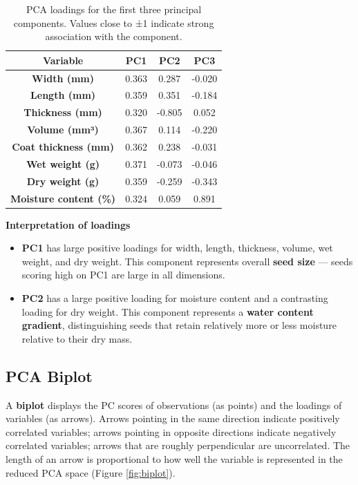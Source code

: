 \documentclass[
]{book}
\providecommand{\tightlist}{%
  \setlength{\itemsep}{0pt}\setlength{\parskip}{0pt}}
\begin{document}
\begin{table}
\centering
\caption{\label{tab:loadings-table}PCA loadings for the first three principal components. Values close to ±1 indicate strong association with the component.}
\centering
\begin{tabular}[t]{>{}c|c|c|c}
\hline
Variable & PC1 & PC2 & PC3\\
\hline
\textbf{Width (mm)} & 0.363 & 0.287 & -0.020\\
\hline
\textbf{Length (mm)} & 0.359 & 0.351 & -0.184\\
\hline
\textbf{Thickness (mm)} & 0.320 & -0.805 & 0.052\\
\hline
\textbf{Volume (mm³)} & 0.367 & 0.114 & -0.220\\
\hline
\textbf{Coat thickness (mm)} & 0.362 & 0.238 & -0.031\\
\hline
\textbf{Wet weight (g)} & 0.371 & -0.073 & -0.046\\
\hline
\textbf{Dry weight (g)} & 0.359 & -0.259 & -0.343\\
\hline
\textbf{Moisture content (\%)} & 0.324 & 0.059 & 0.891\\
\hline
\end{tabular}
\end{table}

\textbf{Interpretation of loadings}

\begin{itemize}
\tightlist
\item
  \textbf{PC1} has large positive loadings for width, length, thickness, volume, wet weight, and dry weight. This component represents overall \textbf{seed size} --- seeds scoring high on PC1 are large in all dimensions.
\item
  \textbf{PC2} has a large positive loading for moisture content and a contrasting loading for dry weight. This component represents a \textbf{water content gradient}, distinguishing seeds that retain relatively more or less moisture relative to their dry mass.
\end{itemize}

\subsection{PCA Biplot}\label{pca-biplot}

A \textbf{biplot} displays the PC scores of observations (as points) and the loadings of variables (as arrows). Arrows pointing in the same direction indicate positively correlated variables; arrows pointing in opposite directions indicate negatively correlated variables; arrows that are roughly perpendicular are uncorrelated. The length of an arrow is proportional to how well the variable is represented in the reduced PCA space (Figure \ref{fig:biplot}).
\end{document}
